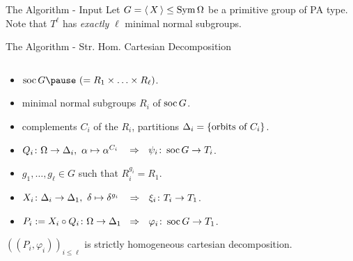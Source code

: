 \begin{frame}{The Algorithm - Input}
    \centering
    \large
    Let $G =  \left\langle \, X \, \right\rangle  \leq \operatorname{Sym} \Omega$ be a primitive group of PA type.
    \\[1em]
    \pause
    Note that $T ^ \ell$ has \emph{exactly} $\ell$ minimal normal subgroups.
\end{frame}


\begin{frame}{The Algorithm - Str. Hom. Cartesian Decomposition}
    \begin{alg}
        $~$
        \\[-1em]
        \begin{itemize}
            \item
            $\soc G \pause ~ (= R_1 \times \ldots \times R_\ell)$.
            \pause
            \item
            minimal normal subgroups $R_i$ of $\operatorname{soc} G$.
            \pause
            \item
            complements $C_i$ of the $R_i$,
            \pause
            partitions $\Delta_i =  \left\{  \text{orbits of } C_i  \right\} $.
            \pause
            \item
            $Q_i \colon \Omega \rightarrow \Delta_i,
            ~ \alpha \mapsto \alpha ^ {C_i}$
            \pause
            $~~\Rightarrow~~ \psi_i \colon \operatorname{soc} G \rightarrow T_i$.
            \pause
            \item
            $g_1, \ldots, g_\ell \in G$ such that $R_i ^ {g_i} = R_1$.
            \pause
            \item
            $X_i \colon \Delta_i \rightarrow \Delta_1,
            ~ \delta \mapsto \delta ^ {g_i}$
            \pause
            $~~\Rightarrow~~ \xi_i \colon T_i \rightarrow T_1$.
            \pause
            \item
            $P_i := X_i \circ Q_i \colon \Omega \rightarrow \Delta_1$
            \pause
            $\hspace{0.5em}\Rightarrow~~ \varphi_i \colon \operatorname{soc} G \rightarrow T_1$.
        \end{itemize}
    \end{alg}
    \pause

    $((P_i, \varphi_i))_{i \leq \ell}$
    is strictly homogeneous cartesian decomposition.
\end{frame}

